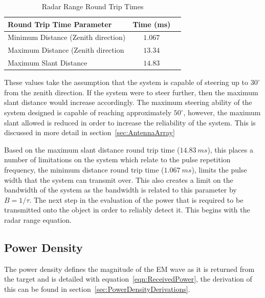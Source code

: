 \documentclass[11pt]{witseiepaper}
\begin{document}
\begin{bibunit}[witseie]
\begin{table}[htb]
    \caption{Radar Range Round Trip Times}
    \label{tab:RadarRangeValues}
    \begin{center}
        \begin{tabular}{p{70mm}cp{70mm}}
            \hline 
            Round Trip Time Parameter & Time (ms) \\
            \hline
            Minimum Distance (Zenith direction) & $1.067$ \\
            Maximum Distance  (Zenith direction & $13.34$ \\
            Maximum Slant Distance & $14.83$ \\
            \hline
        \end{tabular}
    \end{center}
\end{table}
These values take the assumption that the system is capable of steering up to $30^{\circ}$ from the zenith direction. If the system were to steer further, then the maximum slant distance would increase accordingly. The maximum steering ability of the system designed is capable of reaching approximately $50^{\circ}$, however, the maximum slant allowed is reduced in order to increase the reliability of the system. This is discussed in more detail in section~\ref{sec:AntennaArray} %

Based on the maximum slant distance round trip time ($14.83~ms$), this places a number of limitations on the system which relate to the pulse repetition frequency, the minimum distance round trip time ($1.067~ms$), limits the pulse width that the system can transmit over. This also creates a limit on the bandwidth of the system as the bandwidth is related to this parameter by $B = 1/ \tau$.
The next step in the evaluation of the power that is required to be transmitted onto the object in order to reliably detect it. This begins with the radar range equation.

\subsection{Power Density} \label{sec:PowerDensity}
The power density defines the magnitude of the EM wave as it is returned from the target and is detailed with equation~\ref{eqn:ReceivedPower}, the derivation of this can be found in section~\ref{sec:PowerDensityDerivations}. 


\end{bibunit}
\end{document}
